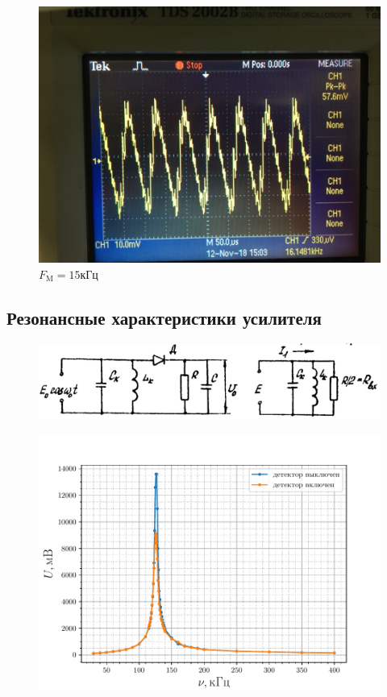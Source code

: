 \begin{figure}[h!]
\begin{minipage}{0.33\linewidth}
		\caption*{$R_2C_2$}
		\caption*{$F_\text{M}=7\text{кГц}$}
	\end{minipage}
	\begin{minipage}{0.33\linewidth}
		\centering
		\includegraphics[width=0.9\linewidth]{photo/15kHztau2.jpg}
		\caption*{$R_2C_2$}
		\caption*{$F_\text{M}=15\text{кГц}$}
	\end{minipage}
\end{figure}

\subsection{Резонансные характеристики усилителя}
 \begin{figure}[h!]
	\centering
	\includegraphics[width=\linewidth]{picture/pic12.jpg}
	\caption{}
	\label{pic:12}
\end{figure}

 \begin{figure}[h!]
 	\centering
 	\includegraphics[width=\linewidth]{fig/exp3c.pdf}
 	\caption{}
 	\label{exp:3.4}
 \end{figure}

